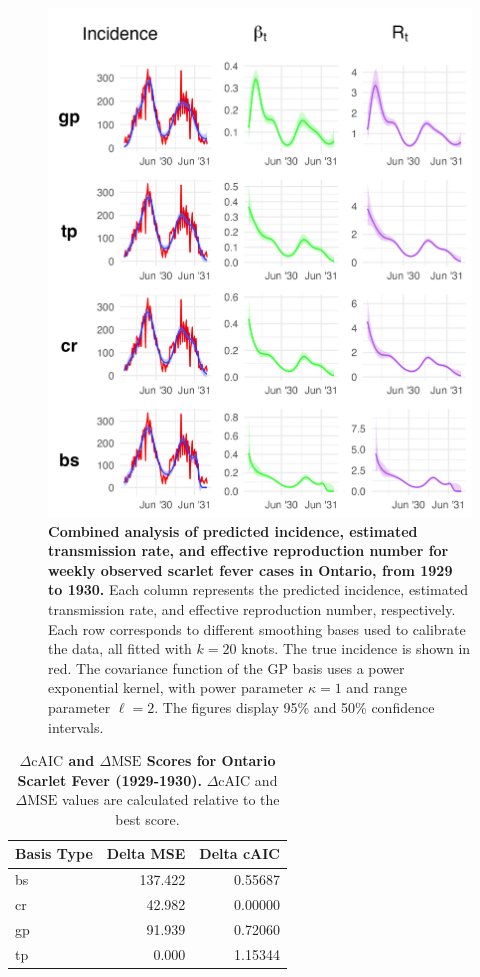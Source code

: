 \documentclass[
11pt, %
oneside, %
english, %
singlespacing, %
]{macthesis} %
\begin{document}
\begin{figure}[H]
\centering
\includegraphics[width=\textwidth, height = \textwidth]{figure/Scarlet/scarlet_combined.png}
\caption[Combined Analysis of Scarlet Fever (1929-1930)]{\textbf{Combined analysis of predicted incidence, estimated transmission rate, and effective reproduction number for weekly observed scarlet fever cases in Ontario, from 1929 to 1930.} Each column represents the predicted incidence, estimated transmission rate, and effective reproduction number, respectively. Each row corresponds to different smoothing bases used to calibrate the data, all fitted with \(k=20\) knots. The true incidence is shown in red. The covariance function of the GP basis uses a power exponential kernel, with power parameter \(\kappa = 1\) and range parameter \(\ell = 2\). The figures display 95\% and 50\% confidence intervals.}
\label{fig:scarlet_combined}
\end{figure}

\begin{table}[!h]
\centering
\caption{\label{tab:aic-table-scarlet}\textbf{\(\Delta \text{cAIC}\) and \(\Delta \text{MSE}\) Scores for Ontario Scarlet Fever (1929-1930).} \(\Delta \text{cAIC}\) and \(\Delta \text{MSE}\) values are calculated relative to the best score.}
\centering
\begin{tabular}[t]{lrr}
\toprule
Basis Type & Delta MSE & Delta cAIC\\
\midrule
bs & 137.422 & 0.55687\\
cr & 42.982 & 0.00000\\
gp & 91.939 & 0.72060\\
tp & 0.000 & 1.15344\\
\bottomrule
\end{tabular}
\end{table}
\end{document}
